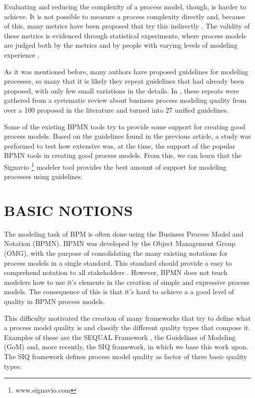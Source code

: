 \documentclass[a4paper,twoside]{article}
\begin{document}
Evaluating and reducing the complexity of a process model, though, is harder to achieve. It is not possible to measure a process complexity directly and, because of this, many metrics have been proposed that try this indirectly \cite{Vanderfeesten2007} \cite{Mendling2008b} \cite{Gruhn2006}. The validity of these metrics is evidenced through statistical experiments, where process models are judged both by the metrics and by people with varying levels of modeling experience \cite{Cardoso2006a} \cite{Sanchez-Gonzalez2008}.

As it was mentioned before, many authors have proposed guidelines for modeling processes, so many that it is likely they repeat guidelines that had already been proposed, with only few small variations in the details. In \cite{Moreno-MontesdeOca2014}, these repeats were gathered from a systematic review about business process modeling quality from over a 100 proposed in the literature and turned into 27 unified guidelines.  

Some of the existing BPMN tools try to provide some support for creating good process models. Based on the guidelines found in the previous article, a study \cite{MoniqueSnoeckIsel2015} was performed to test how extensive was, at the time, the support of the popular BPMN tools in creating good process models. From this, we can learn that the Signavio \footnote{www.signavio.com} modeler tool provides the best amount of support for modeling processes using guidelines. 


\section{BASIC NOTIONS}\label{Fundamentals}\label{Background}

\noindent The modeling task of BPM is often done using the Business Process Model and Notation (BPMN). BPMN was developed by the Object Management Group (OMG), with the purpose of consolidating the many existing notations for process models in a single standard. This standard should provide a easy to comprehend notation to all stakeholders \cite{OMGObjectManagementGroup2015}. However, BPMN does not teach modelers how to use it's elements in the creation of simple and expressive process models. The consequence of this is that it's hard to achieve a a good level of quality in BPMN process models.


This difficulty motivated the creation of many frameworks that try to define what a process model quality is and classify the different quality types that compose it. Examples of these are the SEQUAL Framework \cite{krogstie2012}, the Guidelines of Modeling (GoM) \cite{Schuette1998} and, more recently, the SIQ framework, in which we base this work upon. The SIQ framework defines process model quality as factor of three basic quality types:
\end{document}
